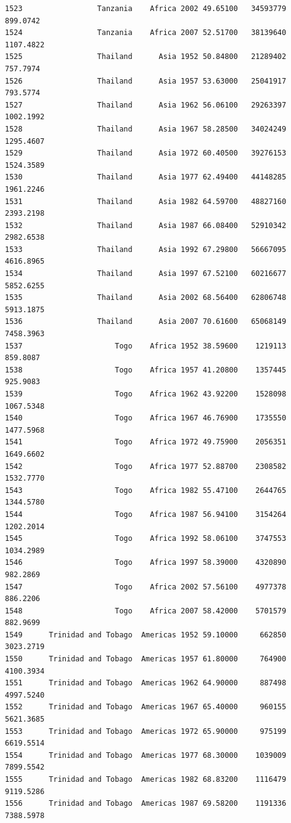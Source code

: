 \documentclass[
  letterpaper,
  DIV=11,
  numbers=noendperiod]{scrreprt}
\begin{document}
\begin{verbatim}
1523                 Tanzania    Africa 2002 49.65100   34593779    899.0742
1524                 Tanzania    Africa 2007 52.51700   38139640   1107.4822
1525                 Thailand      Asia 1952 50.84800   21289402    757.7974
1526                 Thailand      Asia 1957 53.63000   25041917    793.5774
1527                 Thailand      Asia 1962 56.06100   29263397   1002.1992
1528                 Thailand      Asia 1967 58.28500   34024249   1295.4607
1529                 Thailand      Asia 1972 60.40500   39276153   1524.3589
1530                 Thailand      Asia 1977 62.49400   44148285   1961.2246
1531                 Thailand      Asia 1982 64.59700   48827160   2393.2198
1532                 Thailand      Asia 1987 66.08400   52910342   2982.6538
1533                 Thailand      Asia 1992 67.29800   56667095   4616.8965
1534                 Thailand      Asia 1997 67.52100   60216677   5852.6255
1535                 Thailand      Asia 2002 68.56400   62806748   5913.1875
1536                 Thailand      Asia 2007 70.61600   65068149   7458.3963
1537                     Togo    Africa 1952 38.59600    1219113    859.8087
1538                     Togo    Africa 1957 41.20800    1357445    925.9083
1539                     Togo    Africa 1962 43.92200    1528098   1067.5348
1540                     Togo    Africa 1967 46.76900    1735550   1477.5968
1541                     Togo    Africa 1972 49.75900    2056351   1649.6602
1542                     Togo    Africa 1977 52.88700    2308582   1532.7770
1543                     Togo    Africa 1982 55.47100    2644765   1344.5780
1544                     Togo    Africa 1987 56.94100    3154264   1202.2014
1545                     Togo    Africa 1992 58.06100    3747553   1034.2989
1546                     Togo    Africa 1997 58.39000    4320890    982.2869
1547                     Togo    Africa 2002 57.56100    4977378    886.2206
1548                     Togo    Africa 2007 58.42000    5701579    882.9699
1549      Trinidad and Tobago  Americas 1952 59.10000     662850   3023.2719
1550      Trinidad and Tobago  Americas 1957 61.80000     764900   4100.3934
1551      Trinidad and Tobago  Americas 1962 64.90000     887498   4997.5240
1552      Trinidad and Tobago  Americas 1967 65.40000     960155   5621.3685
1553      Trinidad and Tobago  Americas 1972 65.90000     975199   6619.5514
1554      Trinidad and Tobago  Americas 1977 68.30000    1039009   7899.5542
1555      Trinidad and Tobago  Americas 1982 68.83200    1116479   9119.5286
1556      Trinidad and Tobago  Americas 1987 69.58200    1191336   7388.5978

\end{verbatim}
\end{document}
